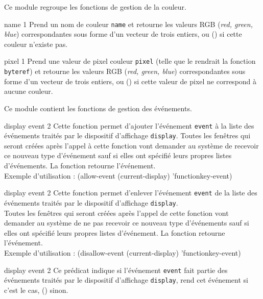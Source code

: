 
Ce module regroupe les fonctions de gestion de la couleur.


 {name} {1}
Prend un nom de couleur {\tt name} et retourne les valeurs RGB
({\em red, green, blue}) correspondantes sous forme d'un vecteur de trois
entiers, ou () si cette couleur n'existe pas.


 {pixel} {1}
Prend une valeur de pixel couleur {\tt pixel} (telle que le rendrait la
fonction {\tt byteref}) et retourne les valeurs RGB ({\em red, green, blue})
correspondantes sous forme d'un vecteur de trois entiers, ou () si cette
valeur de pixel ne correspond \`{a} aucune couleur.




Ce module contient les fonctions de gestion des \'{e}v\'{e}nements.


 {display event} {2}
Cette fonction permet d'ajouter l'\'{e}v\'{e}nement {\tt event} \`{a} la liste des
\'{e}v\'{e}nements trait\'{e}s par le dispositif d'affichage {\tt display}.
Toutes les fen\^{e}tres qui seront cr\'{e}\'{e}es apr\`{e}s
l'appel \`{a} cette fonction vont demander au syst\`{e}me de recevoir
ce nouveau type d'\'{e}v\'{e}nement sauf si elles ont sp\'{e}cifi\'{e} leurs propres
listes d'\'{e}v\'{e}nements.
La fonction retourne l'\'{e}v\'{e}nement.\\
Exemple d'utilisation :
\BeginLL
(allow-event (current-display) 'functionkey-event)
\EndLL


 {display event} {2}
Cette fonction permet d'enlever l'\'{e}v\'{e}nement {\tt event} de la liste des
\'{e}v\'{e}nements trait\'{e}s par le dispositif d'affichage {\tt display}.\\
Toutes les fen\^{e}tres qui seront cr\'{e}\'{e}es
apr\`{e}s l'appel de cette fonction vont demander au syst\`{e}me de ne pas recevoir
ce nouveau type d'\'{e}v\'{e}nements sauf si elles ont sp\'{e}cifi\'{e} leurs propres
listes d'\'{e}v\'{e}nement.
La fonction retourne l'\'{e}v\'{e}nement.\\
Exemple d'utilisation :
\BeginLL
(disallow-event (current-display) 'functionkey-event)
\EndLL


 {display event} {2}
Ce pr\'{e}dicat indique si l'\'{e}v\'{e}nement {\tt event} fait partie des \'{e}v\'{e}nements
trait\'{e}s par le dispositif d'affichage {\tt display}, rend cet \'{e}v\'{e}nement
si c'est le cas, () sinon.



